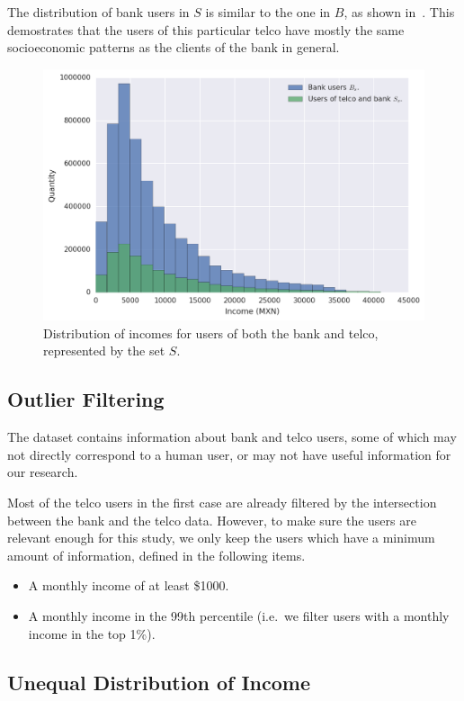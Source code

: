 The distribution of bank users in $S$ is similar to the one in $B$, as shown in~. This demostrates that the users of this particular telco have mostly the same socioeconomic patterns as the clients of the bank in general.

\begin{figure}
\centering
\includegraphics[width=.75\textwidth]{figures/matchdistribution.png}
\caption{Distribution of incomes for users of both the bank and telco, represented by the set $S$.}
\label{fig:matchdistribution}
\end{figure}

\subsection{Outlier Filtering}
\label{subsec:outlier_filtering}

The dataset contains information about bank and telco users, some of which may not directly correspond to a human user, or may not have useful information for our research.

Most of the telco users in the first case are already filtered by the intersection between the bank and the telco data. However, to make sure the users are relevant enough for this study, we only keep the users which have a minimum amount of information, defined in the following items.

\begin{itemize}
	\item A monthly income of at least \$\num{1000}.
	\item A monthly income in the \num{99}th percentile (i.e.\ we filter users with a monthly income in the top 1\%).
\end{itemize}

\subsection{Unequal Distribution of Income}

